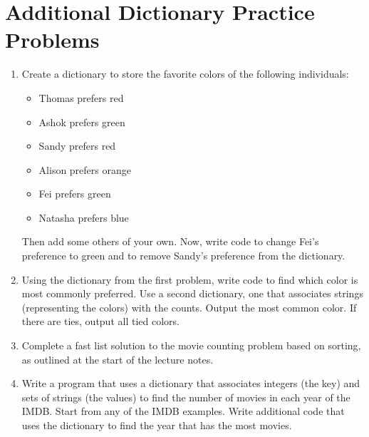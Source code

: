 \documentclass[letterpaper,10pt,english]{sphinxmanual}
\begin{document}
\section{Additional Dictionary Practice Problems}
\label{\detokenize{lecture_notes/lec17_dictionaries2:additional-dictionary-practice-problems}}\begin{enumerate}
\def\theenumi{\arabic{enumi}}
\def\labelenumi{\theenumi .}
\makeatletter\def\p@enumii{\p@enumi \theenumi .}\makeatother
\item {} 
Create a dictionary to store the favorite colors of the following
individuals:
\begin{itemize}
\item {} 
Thomas prefers red

\item {} 
Ashok prefers green

\item {} 
Sandy prefers red

\item {} 
Alison prefers orange

\item {} 
Fei prefers green

\item {} 
Natasha prefers blue

\end{itemize}

Then add some others of your own. Now, write code to change Fei’s
preference to green and to remove Sandy’s preference from the
dictionary.

\item {} 
Using the dictionary from the first problem, write code to find which
color is most commonly preferred. Use a second dictionary, one that
associates strings (representing the colors) with the counts. Output
the most common color. If there are ties, output all tied colors.

\item {} 
Complete a fast list solution to the movie counting problem based
on sorting, as outlined at the start of the lecture notes.

\item {} 
Write a program that uses a dictionary that associates integers
(the key) and sets of strings (the values) to find the number of
movies in each year of the IMDB. Start from any of the IMDB examples.
Write additional code
that uses the  dictionary to find the year that
has the most movies.


\end{enumerate}
\end{document}
